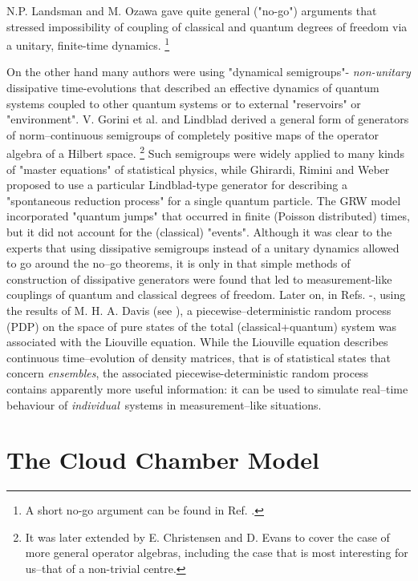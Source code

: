 \documentclass[12pt]{article}
\begin{document}
N.P. Landsman \cite{lan1} and M. Ozawa \cite{oza1} gave quite general
("no-go") arguments that stressed impossibility of coupling of classical
and quantum degrees of freedom via a unitary, finite-time dynamics.
\footnote{A short no-go argument can be found in Ref. \cite{jad1}.}

On the other hand many authors were using "dynamical semigroups"-{\sl
non-unitary} dissipative time-evolutions that described an effective
dynamics of quantum systems coupled to other quantum systems or to external
"reservoirs" or "environment". V. Gorini et al. \cite{gor1} and Lindblad
\cite{lin1} derived a general form of generators of norm--continuous
semigroups of completely positive maps of the operator algebra of a Hilbert
space. \footnote{It was later extended by E. Christensen and D. Evans
\cite{chri1} to cover the case of more general operator algebras, including
the case that is most interesting for us--that of a non-trivial centre.}
Such semigroups were widely applied to many kinds of "master equations" of
statistical physics, while Ghirardi, Rimini and Weber \cite{ghi1} proposed
to use a particular Lindblad-type generator for describing a "spontaneous
reduction process" for a single quantum particle. The GRW model
incorporated "quantum jumps" that occurred in finite (Poisson distributed)
times, but it did not account for the (classical) "events". Although it was
clear to the experts that using dissipative semigroups instead of a unitary
dynamics allowed to go around the no--go theorems, it is only in
\cite{bla1} that simple methods of construction of dissipative generators
were found that led to measurement-like couplings of quantum and classical
degrees of freedom. Later on, in Refs. \cite{bla2}-\cite{jad1}, using the
results of M. H. A. Davis (see \cite{davmha1,davmha2}), a
piecewise--deterministic random process (PDP) on the space of pure states
of the total (classical+quantum) system was associated with the Liouville
equation. While the Liouville equation describes continuous time--evolution
of density matrices, that is of statistical states that concern {\sl
ensembles}, the associated piecewise-deterministic random process contains
apparently more useful information: it can be used to simulate real--time
behaviour of {\sl individual}\, systems in measurement--like situations.

\section{The Cloud Chamber Model}\label{cloud}
\end{document}
